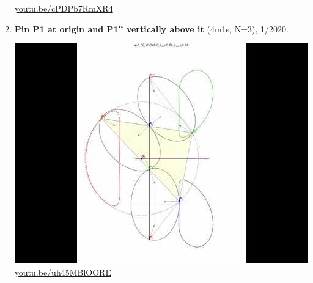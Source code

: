 \documentclass[12pt]{amsart}
\begin{document}
\begin{enumerate}[resume]
\begin{center}
\href{https://youtu.be/cPDPb7RmXR4}{\url{youtu.be/cPDPb7RmXR4}}\end{center}
% 
\item \textbf{Pin P1 at origin and P1'' vertically above it} (4m1s, N=3), 1/2020. 
\begin{center}\includegraphics[width=.5\textwidth]{pics/uh45MBlOORE.jpg} \\ 
\href{https://youtu.be/uh45MBlOORE}{\url{youtu.be/uh45MBlOORE}}\end{center}
% 
\end{enumerate}




\end{document}
